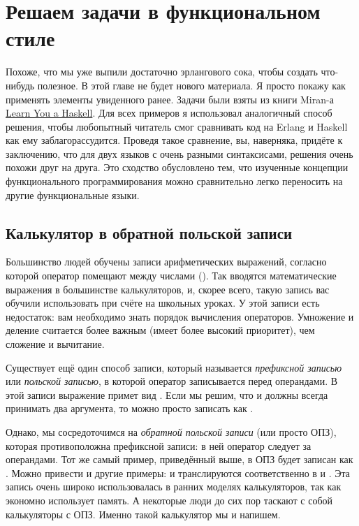 \chapter{Решаем задачи в функциональном стиле}
\label{functionally-solving-problems}
\colorbox{lgray}
{
\begin{minipage}{1.0\linewidth}
    Похоже, что мы уже выпили достаточно эрлангового сока, чтобы создать что\--нибудь полезное.
    В этой главе не будет нового материала.
    Я просто покажу как применять элементы увиденного ранее.
    Задачи были взяты из книги Miran\--а \href{http://learnyouahaskell.com/functionally-solving-problems}{Learn You a Haskell}.
    Для всех примеров я использовал аналогичный способ решения, чтобы любопытный читатель смог сравнивать код на Erlang и Haskell как ему заблагорассудится.
    Проведя такое сравнение, вы, наверняка, придёте к заключению, что для двух языков с очень разными синтаксисами, решения очень похожи друг на друга.
    Это сходство обусловлено тем, что изученные концепции функционального программирования можно сравнительно легко переносить на другие функциональные языки.
\end{minipage}
}
\section{Калькулятор в обратной польской записи}
\label{reverse-polish-notation-calculator}
Большинство людей обучены записи арифметических выражений, согласно которой оператор помещают между числами ().
Так вводятся математические выражения в большинстве калькуляторов, и, скорее всего,  такую запись вас обучили использовать при счёте на школьных уроках. 
У этой записи есть недостаток: вам необходимо знать порядок вычисления операторов.
Умножение и деление считается более важным (имеет более высокий приоритет), чем сложение и вычитание.

Существует ещё один способ записи, который называется \emph{префиксной записью} или \emph{польской записью}, в которой оператор записывается перед операндами.
В этой записи выражение  примет вид .
Если мы решим, что \ops{+\strut}  и \ops{/\strut} должны всегда принимать два аргумента, то  можно просто записать как .

Однако, мы сосредоточимся на \emph{обратной польской записи} (или просто ОПЗ), которая противоположна префиксной записи: в ней оператор следует за операндами.
Тот же самый пример, приведённый выше, в ОПЗ будет записан как .
Можно привести и другие примеры:  и  транслируются соответственно в  и .
Эта запись очень широко использовалась в ранних моделях калькуляторов, так как экономно использует память.
А некоторые люди до сих пор таскают с собой калькуляторы с ОПЗ.
Именно такой калькулятор мы и напишем.

